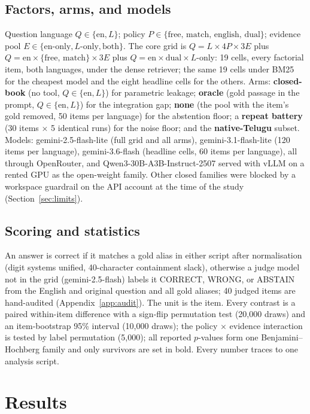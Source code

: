 \subsection{Factors, arms, and models}
\label{sec:factors}
Question language $Q\in\{\text{en}, L\}$; policy $P\in\{\text{free, match, english, dual}\}$; evidence pool $E\in\{\text{en-only}, L\text{-only}, \text{both}\}$. The core grid is $Q{=}L\times 4P\times 3E$ plus $Q{=}\text{en}\times\{\text{free, match}\}\times 3E$ plus $Q{=}\text{en}\times\text{dual}\times L$-only: 19 cells, every factorial item, both languages, under the dense retriever; the same 19 cells under BM25 for the cheapest model and the eight headline cells for the others. Arms: \textbf{closed-book} (no tool, $Q\in\{\text{en},L\}$) for parametric leakage; \textbf{oracle} (gold passage in the prompt, $Q\in\{\text{en},L\}$) for the integration gap; \textbf{none} (the pool with the item's gold removed, 50 items per language) for the abstention floor; a \textbf{repeat battery} (30 items $\times$ 5 identical runs) for the noise floor; and the \textbf{native-Telugu} subset. Models: gemini-2.5-flash-lite (full grid and all arms), gemini-3.1-flash-lite (120 items per language), gemini-3.6-flash (headline cells, 60 items per language), all through OpenRouter, and Qwen3-30B-A3B-Instruct-2507 served with vLLM on a rented GPU as the open-weight family. Other closed families were blocked by a workspace guardrail on the API account at the time of the study (Section~\ref{sec:limits}).

\subsection{Scoring and statistics}
\label{sec:stats}
An answer is correct if it matches a gold alias in either script after normalisation (digit systems unified, 40-character containment slack), otherwise a judge model not in the grid (gemini-2.5-flash) labels it CORRECT, WRONG, or ABSTAIN from the English and original question and all gold aliases; 40 judged items are hand-audited (Appendix~\ref{app:audit}). The unit is the item. Every contrast is a paired within-item difference with a sign-flip permutation test (20{,}000 draws) and an item-bootstrap 95\% interval (10{,}000 draws); the policy $\times$ evidence interaction is tested by label permutation (5{,}000); all reported $p$-values form one Benjamini--Hochberg family \citep{benjamini1995bh} and only survivors are set in bold. Every number traces to one analysis script.

\section{Results}
\label{sec:results}

